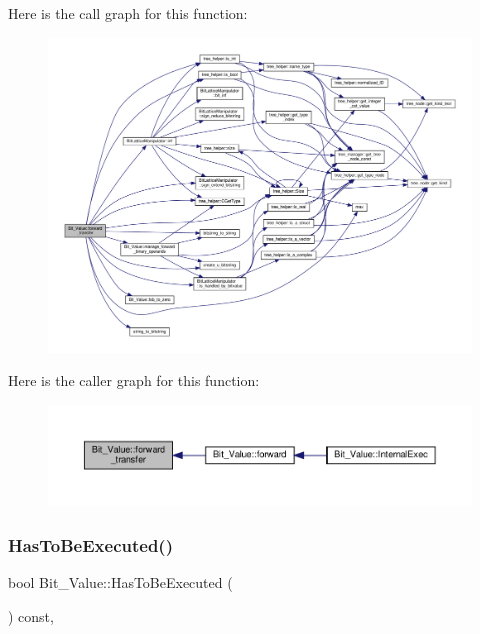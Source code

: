 Here is the call graph for this function\+:
\nopagebreak
\begin{figure}[H]
\begin{center}
\leavevmode
\includegraphics[width=350pt]{df/d4b/classBit__Value_abe0b4a87f9114bc82818b51dbdf0aca7_cgraph}
\end{center}
\end{figure}
Here is the caller graph for this function\+:
\nopagebreak
\begin{figure}[H]
\begin{center}
\leavevmode
\includegraphics[width=350pt]{df/d4b/classBit__Value_abe0b4a87f9114bc82818b51dbdf0aca7_icgraph}
\end{center}
\end{figure}
\mbox{\label{classBit__Value_abcdc2de278483e5b1771f6f90081330a}} 
\subsubsection{\texorpdfstring{Has\+To\+Be\+Executed()}{HasToBeExecuted()}}
{\footnotesize\ttfamily bool Bit\+\_\+\+Value\+::\+Has\+To\+Be\+Executed (\begin{DoxyParamCaption}{ }\end{DoxyParamCaption}) const\hspace{0.3cm}{\ttfamily [override]}, {\ttfamily [virtual]}}



